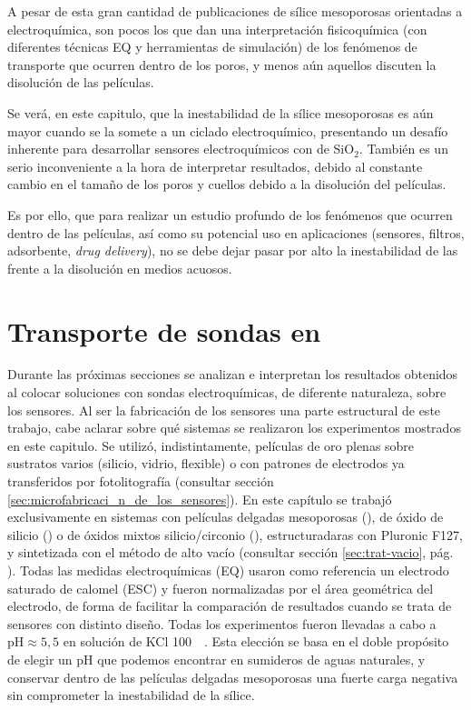 	A pesar de esta gran cantidad de publicaciones de sílice mesoporosas orientadas a electroquímica, son pocos los que dan una interpretación fisicoquímica (con diferentes técnicas EQ y herramientas de simulación) de los fenómenos de transporte que ocurren dentro de los poros, y menos aún aquellos discuten la disolución de las películas. 

	Se verá, en este capitulo, que la inestabilidad de la sílice mesoporosas es aún mayor cuando se la somete a un ciclado electroquímico, presentando un desafío inherente para desarrollar sensores electroquímicos con \pdm\space de SiO$_2$. También es un serio inconveniente a la hora de interpretar resultados, debido al constante cambio en el tamaño de los poros y cuellos debido a la disolución del películas. 

	Es por ello, que para realizar un estudio profundo de los fenómenos que ocurren dentro de las películas, así como su potencial uso en aplicaciones (sensores, filtros, adsorbente, \textit{drug delivery}), no se debe dejar pasar por alto la inestabilidad de las \pdm\space frente a la disolución en medios acuosos.
	
\section{Transporte de sondas en \pdm}

	 Durante las próximas secciones se analizan e interpretan los resultados obtenidos al colocar soluciones con sondas electroquímicas, de diferente naturaleza, sobre los sensores. Al ser la fabricación de los sensores una parte estructural de este trabajo, cabe aclarar sobre qué sistemas se realizaron los experimentos mostrados en este capitulo. Se utilizó, indistintamente, películas de oro plenas sobre sustratos varios (silicio, vidrio, flexible)  o con patrones de electrodos ya transferidos por fotolitografía (consultar sección \ref{sec:microfabricaci_n_de_los_sensores}). En este capítulo se trabajó exclusivamente en sistemas con películas delgadas mesoporosas (\pdm), de óxido de silicio (\pdmF) o de óxidos mixtos silicio/circonio (\pdmZ), estructuradaras con Pluronic F127, y sintetizada con el método de alto vacío (consultar sección \ref{sec:trat-vacio}, pág. \pageref{sec:trat-vacio}). Todas las medidas electroquímicas (EQ) usaron como referencia un electrodo saturado de calomel (ESC) y fueron normalizadas por el área geométrica del electrodo, de forma de facilitar la comparación de resultados cuando se trata de sensores con distinto diseño. Todas los experimentos fueron llevadas a cabo a $\text{pH}\approx5,5$ en solución de KCl \SI{100}{\milli\Molar}. Esta elección se basa en el doble propósito de elegir un pH que podemos encontrar en sumideros de aguas naturales, y conservar dentro de las películas delgadas mesoporosas una fuerte carga negativa sin comprometer la inestabilidad de la sílice.

